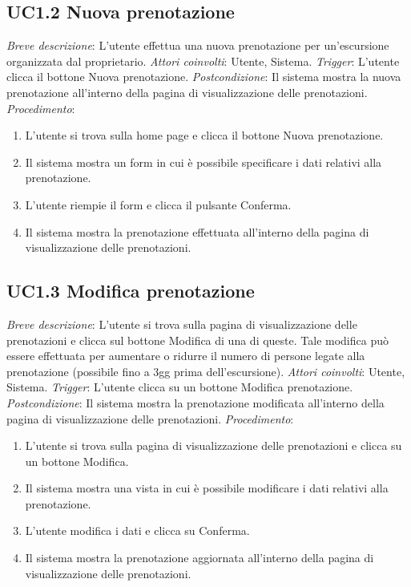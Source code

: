 \subsection{UC1.2 Nuova prenotazione}
\noindent \emph{Breve descrizione}: L'utente effettua una nuova prenotazione per un'escursione organizzata dal proprietario.\medbreak
\noindent \emph{Attori coinvolti}: Utente, Sistema.\medbreak
\noindent \emph{Trigger}: L'utente clicca il bottone Nuova prenotazione.\medbreak
\noindent \emph{Postcondizione}: Il sistema mostra la nuova prenotazione all'interno della pagina di visualizzazione delle prenotazioni.\medbreak
\noindent \emph{Procedimento}:

\begin{enumerate}
    \item L'utente si trova sulla home page e clicca il bottone Nuova prenotazione.
    \item Il sistema mostra un form in cui è possibile specificare i dati relativi alla prenotazione.
    \item L'utente riempie il form e clicca il pulsante Conferma.
    \item Il sistema mostra la prenotazione effettuata all'interno della pagina di visualizzazione delle prenotazioni.
\end{enumerate}

\subsection{UC1.3 Modifica prenotazione}
\noindent \emph{Breve descrizione}: L'utente si trova sulla pagina di visualizzazione delle prenotazioni e clicca sul bottone Modifica di una di queste. Tale modifica può essere effettuata per aumentare o ridurre il numero di persone legate alla prenotazione (possibile fino a 3gg prima dell'escursione).\medbreak
\noindent \emph{Attori coinvolti}: Utente, Sistema.\medbreak
\noindent \emph{Trigger}: L'utente clicca su un bottone Modifica prenotazione.\medbreak
\noindent \emph{Postcondizione}: Il sistema mostra la prenotazione modificata all'interno della pagina di visualizzazione delle prenotazioni.\medbreak
\noindent \emph{Procedimento}:

\begin{enumerate}
    \item L'utente si trova sulla pagina di visualizzazione delle prenotazioni e clicca su un bottone Modifica.
    \item Il sistema mostra una vista in cui è possibile modificare i dati relativi alla prenotazione.
    \item L'utente modifica i dati e clicca su Conferma.
    \item Il sistema mostra la prenotazione aggiornata all'interno della pagina di visualizzazione delle prenotazioni.
\end{enumerate}

